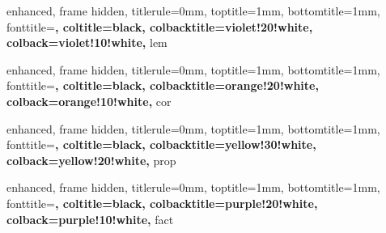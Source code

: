 {
    enhanced, frame hidden, titlerule=0mm, toptitle=1mm, bottomtitle=1mm,
    fonttitle=\bfseries\large, coltitle=black,
    colbacktitle=violet!20!white, colback=violet!10!white,
}{lem}


\newenvironment{lempf}{
	{\noindent{\it \textbf{Proof for Lemma}}}
	\tcolorbox[blanker,breakable,left=5mm,parbox=false,top=8pt,
    before upper={\parindent15pt}, after skip=10pt,
	borderline west={1mm}{0pt}{violet!20!white}]
}{
    \textcolor{violet!20!white}{\hbox{}\nobreak\hfill$\blacksquare$}
    \endtcolorbox
}

{
    enhanced, frame hidden, titlerule=0mm, toptitle=1mm, bottomtitle=1mm,
    fonttitle=\bfseries\large, coltitle=black,
    colbacktitle=orange!20!white, colback=orange!10!white,
}{cor}


{
    enhanced, frame hidden, titlerule=0mm, toptitle=1mm, bottomtitle=1mm,
    fonttitle=\bfseries\large, coltitle=black,
    colbacktitle=yellow!30!white, colback=yellow!20!white,
}{prop}


{
    enhanced, frame hidden, titlerule=0mm, toptitle=1mm, bottomtitle=1mm,
    fonttitle=\bfseries\large, coltitle=black,
    colbacktitle=purple!20!white, colback=purple!10!white,
}{fact}



